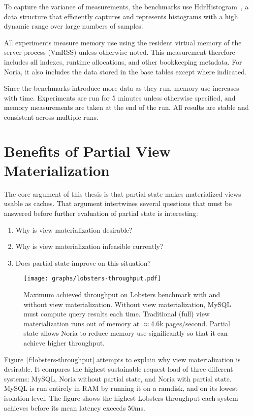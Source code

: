 To capture the variance of measurements, the benchmarks use
HdrHistogram~\cite{hdrhistogram}, a data structure that efficiently captures and
represents histograms with a high dynamic range over large numbers of samples.

All experiments measure memory use using the resident virtual memory of the
server process (VmRSS) unless otherwise noted. This measurement therefore
includes all indexes, runtime allocations, and other bookkeeping metadata. For
Noria, it also includes the data stored in the base tables except where
indicated.

Since the benchmarks introduce more data as they run, memory use increases with
time. Experiments are run for 5 minutes unless otherwise specified, and memory
measurements are taken at the end of the run. All results are stable and
consistent across multiple runs.

\section{Benefits of Partial View Materialization}
\label{s:eval:why}

The core argument of this thesis is that partial state makes materialized views
usable as caches. That argument intertwines several questions that must be
answered before further evaluation of partial state is interesting:

\begin{enumerate}
    \item Why is view materialization desirable?
    \item Why is view materialization infeasible currently?
    \item Does partial state improve on this situation?
\end{enumerate}

\begin{figure}[h]
  \centering
  \texttt{[image: graphs/lobsters-throughput.pdf]}
  \caption{Maximum achieved throughput on Lobsters benchmark with and without
  view materialization. Without view materialization, MySQL must compute query
  results each time. Traditional (full) view materialization runs out of memory
  at $\approx$4.6k pages/second. Partial state allows Noria to reduce memory use
  significantly so that it can achieve higher throughput.}
  \label{f:lobsters-throughput}
\end{figure}

Figure~\vref{f:lobsters-throughput} attempts to explain why view materialization
is desirable. It compares the highest sustainable request load of three
different systems: MySQL, Noria without partial state, and Noria with partial
state. MySQL is run entirely in RAM by running it on a ramdisk, and on its
lowest isolation level. The figure shows the highest Lobsters throughput each
system achieves before its mean latency exceeds 50ms.

